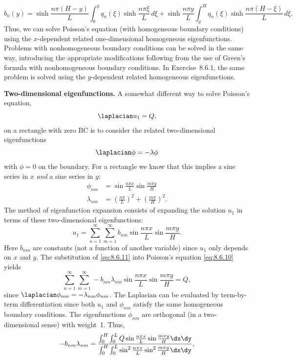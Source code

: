 \begin{equation}
\label{eq:8.6.9}
\boxed{b_n(y) = \sinh\frac{n\pi(H-y)}{L}\int_0^y q_n(\xi)\sinh\frac{n\pi\xi}{L}\,d\xi
+ \sinh\frac{n\pi y}{L}\int_y^H q_n(\xi)\sinh\frac{n\pi(H-\xi)}{L}\,d\xi.}
\end{equation}
Thus, we can solve Poisson's equation (with homogeneous boundary conditions) using the $x$-dependent related one-dimensional homogeneous eigenfunctions.  Problems with nonhomogeneous boundary conditions can be solved in the same way, introducing the appropriate modifications following from the use of Green's formula with nonhomogeneous boundary conditions.  In Exercise~8.6.1, the same problem is solved using the $y$-dependent related homogeneous eigenfunctions.

\textbf{Two-dimensional eigenfunctions.}
A somewhat different way to solve Poisson's equation,
\begin{equation}
\label{eq:8.6.10}
\laplacian u_1 = Q,
\end{equation}
on a rectangle with zero BC is to consider the related two-dimensional eigenfunctions
\[
\laplacian\phi = -\lambda\phi
\]
with $\phi = 0$ on the boundary.  For a rectangle we know that this implies a sine series in $x$ \emph{and} a sine series in $y$:
\begin{align*}
\phi_{nm} &= \sin\frac{n\pi x}{L}\sin\frac{m\pi y}{H} \\
\lambda_{nm} &= \left(\frac{n\pi}{L}\right)^2 + \left(\frac{m\pi}{H}\right)^2.
\end{align*}
The method of eigenfunction expansion consists of expanding the solution $u_1$ in terms of these two-dimensional eigenfunctions:
\begin{equation}
\label{eq:8.6.11}
\boxed{u_1 = \sum_{n=1}^{\infty}\sum_{m=1}^{\infty} b_{nm}\sin\frac{n\pi x}{L}\sin\frac{m\pi y}{H}.}
\end{equation}
Here $b_{nm}$ are constants (not a function of another variable) since $u_1$ only depends on $x$ and $y$.  The substitution of \eqref{eq:8.6.11} into Poisson's equation \eqref{eq:8.6.10} yields
\[
\sum_{n=1}^{\infty}\sum_{m=1}^{\infty} -b_{nm}\lambda_{nm}\sin\frac{n\pi x}{L}\sin\frac{m\pi y}{H} = Q,
\]
since $\laplacian\phi_{nm} = -\lambda_{nm}\phi_{nm}$.  The Laplacian can be evaluated by term-by-term differentiation since both $u_1$ and $\phi_{nm}$ satisfy the same homogeneous boundary conditions.  The eigenfunctions $\phi_{nm}$ are orthogonal (in a two-dimensional sense) with weight~1.  Thus,
\begin{equation}
\label{eq:8.6.12}
-b_{nm}\lambda_{nm} = \frac{\int_0^H\int_0^L Q\sin\frac{n\pi x}{L}\sin\frac{m\pi y}{H}\dx\dy}{\int_0^H\int_0^L \sin^2\frac{n\pi x}{L}\sin^2\frac{m\pi y}{H}\dx\dy},
\end{equation}
